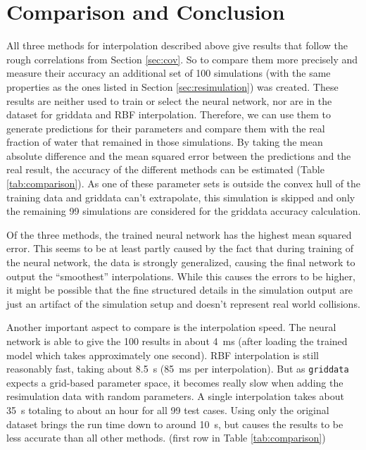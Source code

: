 \chapter{Comparison and Conclusion}
\label{sec:comparison}

All three methods for interpolation described above give results that follow the rough correlations from Section \ref{sec:cov}. So to compare them more precisely and measure their accuracy an additional set of 100 simulations (with the same properties as the ones listed in Section \ref{sec:resimulation}) was created. These results are neither used to train or select the neural network, nor are in the dataset for griddata and RBF interpolation. Therefore, we can use them to generate predictions for their parameters and compare them with the real fraction of water that remained in those simulations. By taking the mean absolute difference and the mean squared error between the predictions and the real result, the accuracy of the different methods can be estimated (Table \ref{tab:comparison}). As one of these parameter sets is outside the convex hull of the training data and griddata can't extrapolate, this simulation is skipped and only the remaining 99 simulations are considered for the griddata accuracy calculation. 

Of the three methods, the trained neural network has the highest mean squared error. This seems to be at least partly caused by the fact that during training of the neural network, the data is strongly generalized, causing the final network to output the \enquote{smoothest} interpolations. While this causes the errors to be higher, it might be possible that the fine structured details in the simulation output are just an artifact of the simulation setup and doesn't represent real world collisions.


Another important aspect to compare is the interpolation speed. The neural network is able to give the 100 results in about \SI{4}{\milli\second} (after loading the trained model which takes approximately one second). RBF interpolation is still reasonably fast, taking about \SI{8.5}{\second} (\SI{85}{\milli\second} per interpolation). But as \texttt{griddata} expects a grid-based parameter space, it becomes really slow when adding the resimulation data with random parameters. A single interpolation takes about \SI{35}{\second} totaling to about an hour for all 99 test cases. Using only the original dataset brings the run time down to around \SI{10}{\second}, but causes the results to be less accurate than all other methods. (first row in Table \ref{tab:comparison})

